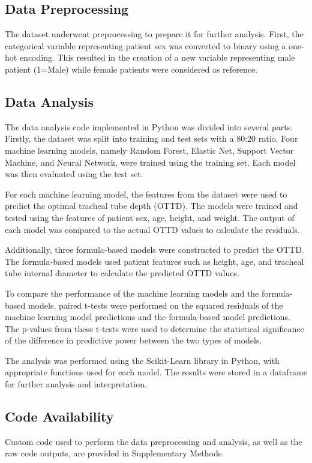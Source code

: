 \documentclass[11pt]{article}
\begin{document}
\subsection*{Data Preprocessing}
The dataset underwent preprocessing to prepare it for further analysis. First, the categorical variable representing patient sex was converted to binary using a one-hot encoding. This resulted in the creation of a new variable representing male patient (1=Male) while female patients were considered as reference. 

\subsection*{Data Analysis}
The data analysis code implemented in Python was divided into several parts. Firstly, the dataset was split into training and test sets with a 80:20 ratio. Four machine learning models, namely Random Forest, Elastic Net, Support Vector Machine, and Neural Network, were trained using the training set. Each model was then evaluated using the test set. 

For each machine learning model, the features from the dataset were used to predict the optimal tracheal tube depth (OTTD). The models were trained and tested using the features of patient sex, age, height, and weight. The output of each model was compared to the actual OTTD values to calculate the residuals.

Additionally, three formula-based models were constructed to predict the OTTD. The formula-based models used patient features such as height, age, and tracheal tube internal diameter to calculate the predicted OTTD values. 

To compare the performance of the machine learning models and the formula-based models, paired t-tests were performed on the squared residuals of the machine learning model predictions and the formula-based model predictions. The p-values from these t-tests were used to determine the statistical significance of the difference in predictive power between the two types of models.

The analysis was performed using the Scikit-Learn library in Python, with appropriate functions used for each model. The results were stored in a dataframe for further analysis and interpretation.\subsection*{Code Availability}

Custom code used to perform the data preprocessing and analysis, as well as the raw code outputs, are provided in Supplementary Methods.
\end{document}
